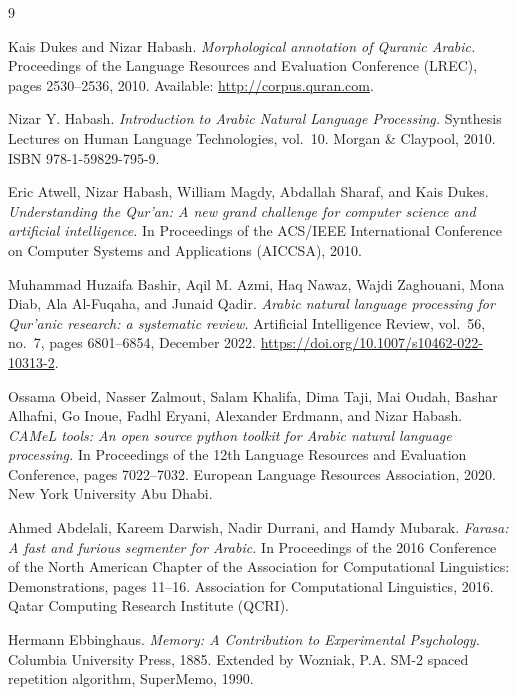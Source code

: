 \documentclass[A4paper,12pt]{article}
\begin{document}
\newpage
\begin{thebibliography}{9}


Kais Dukes and Nizar Habash.
\textit{Morphological annotation of {Q}uranic {A}rabic.}
Proceedings of the Language Resources and Evaluation Conference (LREC),
pages 2530--2536, 2010.
Available: \url{http://corpus.quran.com}.

Nizar Y. Habash.
\textit{Introduction to Arabic Natural Language Processing.}
Synthesis Lectures on Human Language Technologies, vol.~10.
Morgan \& Claypool, 2010.
ISBN 978-1-59829-795-9.

Eric Atwell, Nizar Habash, William Magdy, Abdallah Sharaf, and Kais Dukes.
\textit{Understanding the {Q}ur'an: A new grand challenge for computer science
and artificial intelligence.}
In Proceedings of the ACS/IEEE International Conference on Computer Systems
and Applications (AICCSA), 2010.

Muhammad Huzaifa Bashir, Aqil M. Azmi, Haq Nawaz, Wajdi Zaghouani, Mona Diab,
Ala Al-Fuqaha, and Junaid Qadir.
\textit{Arabic natural language processing for {Q}ur'anic research: a systematic review.}
Artificial Intelligence Review, vol.~56, no.~7, pages 6801--6854, December 2022.
\url{https://doi.org/10.1007/s10462-022-10313-2}.

Ossama Obeid, Nasser Zalmout, Salam Khalifa, Dima Taji, Mai Oudah, Bashar Alhafni,
Go Inoue, Fadhl Eryani, Alexander Erdmann, and Nizar Habash.
\textit{{CAMeL} tools: An open source python toolkit for Arabic natural language processing.}
In Proceedings of the 12th Language Resources and Evaluation Conference,
pages 7022--7032. European Language Resources Association, 2020.
New York University Abu Dhabi.

Ahmed Abdelali, Kareem Darwish, Nadir Durrani, and Hamdy Mubarak.
\textit{Farasa: A fast and furious segmenter for Arabic.}
In Proceedings of the 2016 Conference of the North American Chapter of the
Association for Computational Linguistics: Demonstrations, pages 11--16.
Association for Computational Linguistics, 2016.
Qatar Computing Research Institute (QCRI).

Hermann Ebbinghaus.
\textit{Memory: A Contribution to Experimental Psychology.}
Columbia University Press, 1885.
Extended by Wozniak, P.A. SM-2 spaced repetition algorithm, SuperMemo, 1990.


\end{thebibliography}
\end{document}
